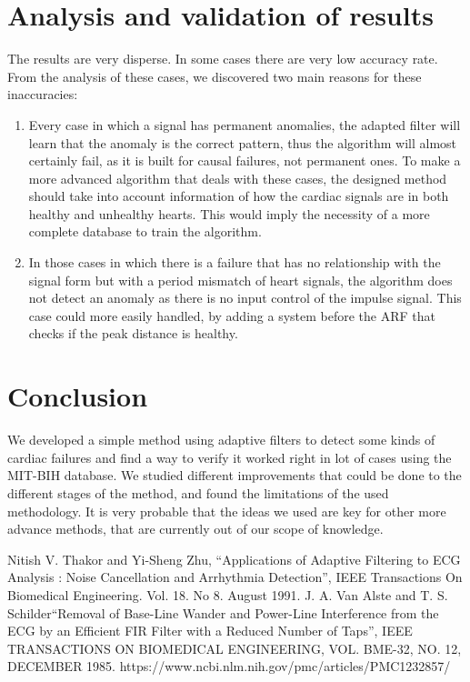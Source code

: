 \documentclass[conference]{IEEEtran}
\begin{document}
\section{Analysis and validation of results}

The results are very disperse. In some cases there are very low accuracy rate. From the analysis of these cases, we discovered two main reasons for these inaccuracies: \par
\begin{enumerate}
\item Every case in which a signal has permanent anomalies, the adapted filter will learn that the anomaly is the correct pattern, thus the algorithm will almost certainly fail, as it is built for causal failures, not permanent ones. To make a more advanced algorithm that deals with these cases, the designed method should take into account information of how the cardiac signals are in both healthy and unhealthy hearts. This would imply the necessity of a more complete database to train the algorithm.
\item In those cases in which there is a failure that has no relationship with the signal form but with a period mismatch of heart signals, the algorithm does not detect an anomaly as there is no input control of the impulse signal. This case could more easily handled, by adding a system before the ARF that checks if the peak distance is healthy. 
\end{enumerate}

\section{Conclusion}
We developed a simple method using adaptive filters to detect some kinds of cardiac failures and find a way to verify it worked right in lot of cases using the MIT-BIH database. We studied different improvements that could be done to the different stages of the method, and found the limitations of the used methodology. It is very probable that the ideas we used are key for other more advance methods, that are currently out of our scope of knowledge.

\begin{thebibliography}{00}
 Nitish V. Thakor and Yi-Sheng Zhu, ``Applications of Adaptive Filtering to ECG Analysis :
Noise Cancellation and Arrhythmia Detection'', IEEE Transactions On Biomedical Engineering. Vol. 18. No 8. August 1991.
 J. A. Van Alste and T. S. Schilder``Removal of Base-Line Wander and Power-Line Interference from the ECG by an Efficient FIR Filter with a Reduced Number of Taps'', IEEE TRANSACTIONS ON BIOMEDICAL ENGINEERING, VOL. BME-32, NO. 12, DECEMBER 1985.
 https://www.ncbi.nlm.nih.gov/pmc/articles/PMC1232857/
\end{thebibliography}
\end{document}
